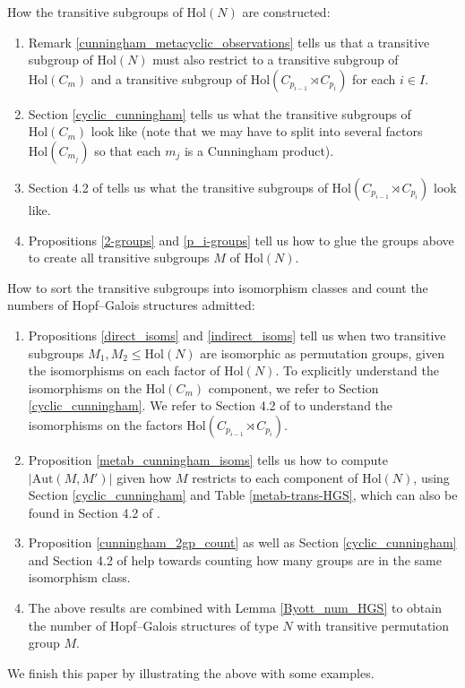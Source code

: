 \documentclass[a4paper,reqno]{amsart}
\theoremstyle{definition}
\newcommand{\Aut}{\mathrm{Aut}}
\newcommand{\Hol}{\mathrm{Hol}}
\begin{document}
How the transitive subgroups of $\Hol(N)$ are constructed:
\begin{enumerate}[label=$\bullet$]
    \item Remark \ref{cunningham_metacyclic_observations} tells us that a transitive subgroup of $\Hol(N)$ must also restrict to a transitive subgroup of $\Hol(C_m)$ and a transitive subgroup of $\Hol(C_{p_{i-1}} \rtimes C_{p_i})$ for each $i \in I$.
    \item Section \ref{cyclic_cunningham} tells us what the transitive subgroups of $\Hol(C_m)$ look like (note that we may have to split into several factors $\Hol(C_{m_j})$ so that each $m_j$ is a Cunningham product).
    \item Section 4.2 of \cite{BML21} tells us what the transitive subgroups of $\Hol(C_{p_{i-1}} \rtimes C_{p_i})$ look like.
    \item Propositions \ref{2-groups} and \ref{p_i-groups} tell us how to glue the groups above to create all transitive subgroups $M$ of $\Hol(N)$.
\end{enumerate}
How to sort the transitive subgroups into isomorphism classes and count the numbers of Hopf--Galois structures admitted:
\begin{enumerate}[label=$\bullet$]
    \item Propositions \ref{direct_isoms} and \ref{indirect_isoms} tell us when two transitive subgroups $M_1,M_2 \leq \Hol(N)$ are isomorphic as permutation groups, given the isomorphisms on each factor of $\Hol(N)$. To explicitly understand the isomorphisms on the $\Hol(C_m)$ component, we refer to Section \ref{cyclic_cunningham}. We refer to Section 4.2 of \cite{BML21} to understand the isomorphisms on the factors $\Hol(C_{p_{i-1}} \rtimes C_{p_i})$.
    \item Proposition \ref{metab_cunningham_isoms} tells us how to compute $|\Aut(M,M')|$ given how $M$ restricts to each component of $\Hol(N)$, using Section \ref{cyclic_cunningham} and Table \ref{metab-trans-HGS}, which can also be found in Section 4.2 of \cite{BML21}.
    \item Proposition \ref{cunningham_2gp_count} as well as Section \ref{cyclic_cunningham} and Section 4.2 of \cite{BML21} help towards counting how many groups are in the same isomorphism class.
    \item The above results are combined with Lemma \ref{Byott_num_HGS} to obtain the number of Hopf--Galois structures of type $N$ with transitive permutation group $M$.
\end{enumerate}
We finish this paper by illustrating the above with some examples.
\end{document}
